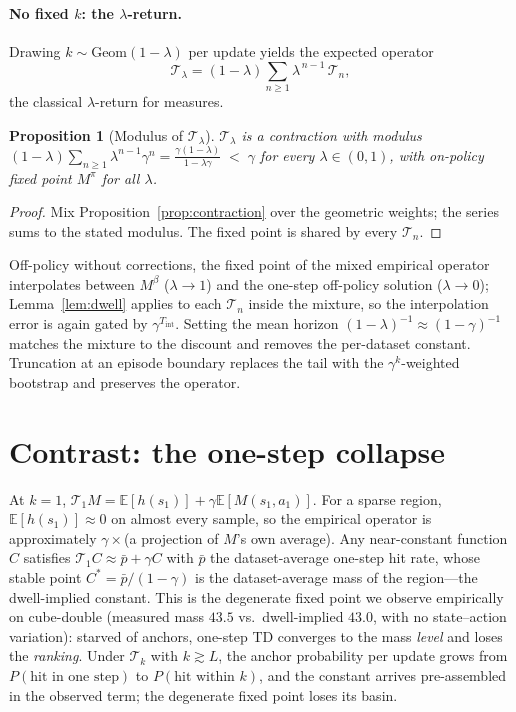 \documentclass{article}
\newtheorem{proposition}{Proposition}
\newcommand{\M}{M}
\newcommand{\Tk}{\mathcal{T}_k}
\newcommand{\Tlam}{\mathcal{T}_\lambda}
\providecommand{\E}{\mathbb{E}}
\begin{document}
\paragraph{No fixed \(k\): the \(\lambda\)-return.}
Drawing \(k\sim\mathrm{Geom}(1-\lambda)\) per update yields the expected
operator
\begin{equation}
\Tlam=(1-\lambda)\sum_{n\ge1}\lambda^{\,n-1}\,\mathcal{T}_n ,
\end{equation}
the classical \(\lambda\)-return for measures.

\begin{proposition}[Modulus of \(\Tlam\)]
\(\Tlam\) is a contraction with modulus
\((1-\lambda)\sum_{n\ge1}\lambda^{n-1}\gamma^{n}
=\frac{\gamma(1-\lambda)}{1-\lambda\gamma}\;<\;\gamma\)
for every \(\lambda\in(0,1)\), with on-policy fixed point \(\M^\pi\) for all
\(\lambda\).
\end{proposition}
\begin{proof}
Mix Proposition~\ref{prop:contraction} over the geometric weights; the series
sums to the stated modulus. The fixed point is shared by every \(\mathcal{T}_n\).
\end{proof}

Off-policy without corrections, the fixed point of the mixed empirical operator
interpolates between \(\M^\beta\) (\(\lambda\to1\)) and the one-step
off-policy solution (\(\lambda\to0\)); Lemma~\ref{lem:dwell} applies to each
\(\mathcal{T}_n\) inside the mixture, so the interpolation error is again gated
by \(\gamma^{T_{\mathrm{int}}}\). Setting the mean horizon
\((1-\lambda)^{-1}\approx(1-\gamma)^{-1}\) matches the mixture to the discount
and removes the per-dataset constant. Truncation at an episode boundary
replaces the tail with the \(\gamma^{k}\)-weighted bootstrap and preserves the
operator.

\section{Contrast: the one-step collapse}

At \(k{=}1\), \(\mathcal{T}_1\M=\E[h(s_1)]+\gamma\E[\M(s_1,a_1)]\). For a
sparse region, \(\E[h(s_1)]\approx0\) on almost every sample, so the empirical
operator is approximately \(\gamma\times\)(a projection of \(\M\)'s own
average). Any near-constant function \(C\) satisfies
\(\mathcal{T}_1 C\approx\bar p+\gamma C\) with \(\bar p\) the dataset-average
one-step hit rate, whose stable point \(C^\ast=\bar p/(1-\gamma)\) is the
dataset-average mass of the region---the dwell-implied constant. This is the
degenerate fixed point we observe empirically on cube-double (measured mass
\(43.5\) vs.\ dwell-implied \(43.0\), with no state--action variation): starved
of anchors, one-step TD converges to the mass \emph{level} and loses the
\emph{ranking}. Under \(\Tk\) with \(k\gtrsim L\), the anchor probability per
update grows from \(P(\text{hit in one step})\) to
\(P(\text{hit within }k)\), and the constant arrives pre-assembled in the
observed term; the degenerate fixed point loses its basin.
\end{document}
